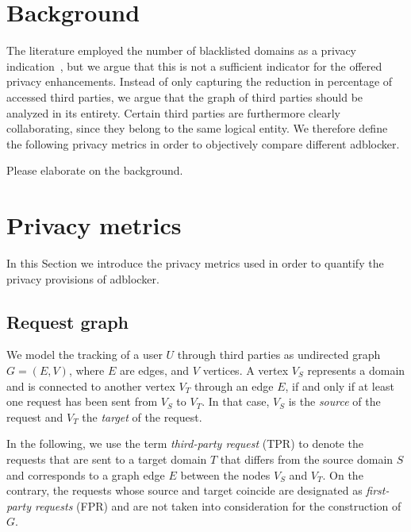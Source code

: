 \documentclass{sig-alternate}
\begin{document}
\section{Background} \label{sec:background}
The literature employed the number of blacklisted domains as a privacy indication~\cite{XX}, but we argue that this is not a sufficient indicator for the offered privacy enhancements. Instead of only capturing the reduction in percentage of accessed third parties, we argue that the graph of third parties should be analyzed in its entirety. Certain third parties are furthermore clearly collaborating, since they belong to the same logical entity. We therefore define the following privacy metrics in order to objectively compare different adblocker.

{\color{red}Please elaborate on the background. }

\section{Privacy metrics} \label{sec:privacy_metrics}
In this Section we introduce the privacy metrics used in order to quantify the privacy provisions of adblocker.


\subsection{Request graph} \label{sec:graph_definition}
We model the tracking of a user $U$ through third parties as undirected graph $G=(E,V)$, where $E$ are edges, and $V$ vertices. A vertex $V_S$ represents a domain and is connected to another vertex $V_T$ through an edge $E$, if and only if at least one request has been sent from $V_S$ to $V_T$. In that case, $V_S$ is the \textit{source} of the request and $V_T$ the \textit{target} of the request.

In the following, we use the term \textit{third-party request} (TPR) to denote the requests that are sent to a target domain $T$ that differs from the source domain $S$ and corresponds to a graph edge $E$ between the nodes $V_S$ and $V_T$. On the contrary, the requests whose source and target coincide are designated as \textit{first-party requests} (FPR) and are not taken into consideration for the construction of $G$.
\end{document}
